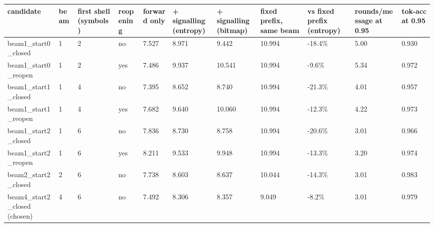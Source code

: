 \begin{tabular}{lllllllllll}
\hline
candidate & beam & first shell (symbols) & reopening & forward only & + signalling (entropy) & + signalling (bitmap) & fixed prefix, same beam & vs fixed prefix (entropy) & rounds/message at 0.95 & tok-acc at 0.95 \\
\hline
beam1\_start0\_closed & 1 & 2 & no & 7.527 & 8.971 & 9.442 & 10.994 & -18.4\% & 5.00 & 0.930 \\
beam1\_start0\_reopen & 1 & 2 & yes & 7.486 & 9.937 & 10.541 & 10.994 & -9.6\% & 5.34 & 0.972 \\
beam1\_start1\_closed & 1 & 4 & no & 7.395 & 8.652 & 8.740 & 10.994 & -21.3\% & 4.01 & 0.957 \\
beam1\_start1\_reopen & 1 & 4 & yes & 7.682 & 9.640 & 10.060 & 10.994 & -12.3\% & 4.22 & 0.973 \\
beam1\_start2\_closed & 1 & 6 & no & 7.836 & 8.730 & 8.758 & 10.994 & -20.6\% & 3.01 & 0.966 \\
beam1\_start2\_reopen & 1 & 6 & yes & 8.211 & 9.533 & 9.948 & 10.994 & -13.3\% & 3.20 & 0.974 \\
beam2\_start2\_closed & 2 & 6 & no & 7.738 & 8.603 & 8.637 & 10.044 & -14.3\% & 3.01 & 0.983 \\
beam4\_start2\_closed (chosen) & 4 & 6 & no & 7.492 & 8.306 & 8.357 & 9.049 & -8.2\% & 3.01 & 0.979 \\
\hline
\end{tabular}
